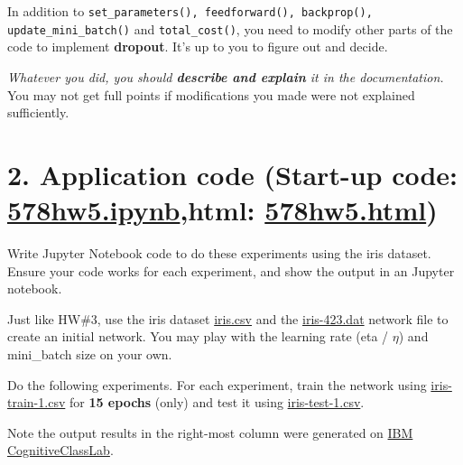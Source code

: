 \documentclass[11pt]{article}
\begin{document}
In addition to \texttt{set\_parameters(), feedforward(), backprop(), update\_mini\_batch()} and \texttt{total\_cost()}, you need to modify other parts of the code to implement \textbf{dropout}.  It's up to you to figure out and decide. 

\emph{Whatever you did, you should \textbf{describe and explain} it in the documentation.}  You may not get full points if modifications you made were not explained sufficiently.


\section*{2. Application code (Start-up code: \href{./578hw5.ipynb}{578hw5.ipynb},html: \href{./578hw5.html}{578hw5.html})}
\label{sec:org13dcc25}

Write Jupyter Notebook code to do these experiments using the iris dataset.  Ensure your code works for each experiment, and show the output in an Jupyter notebook.

Just like HW\#3, use the iris dataset \href{./iris.csv}{iris.csv} and the \href{./iris-423.dat}{iris-423.dat} network file to create an initial network.  You may play with the learning rate (eta / \(\eta\)) and mini\_batch size on your own.

Do the following experiments.  For each experiment, train the network using \href{./iris-train-1.csv}{iris-train-1.csv} for \textbf{15 epochs} (only) and test it using \href{./iris-test-1.csv}{iris-test-1.csv}.

Note the output results in the right-most column were generated on \href{https://labs.cognitiveclass.ai/}{IBM CognitiveClassLab}.
\end{document}
